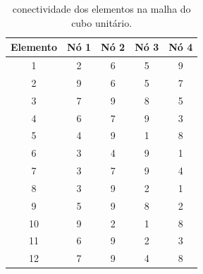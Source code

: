 \begin{table}
    \centering
    \caption{conectividade dos elementos na malha do cubo unitário.}
    \begin{tabular}{c | c c c c}
        \toprule
        \textbf{Elemento} & \textbf{Nó 1} & \textbf{Nó 2} & \textbf{Nó 3}  & \textbf{Nó 4} \\
        \midrule
        1 & 2 & 6 & 5 & 9 \\
        2 & 9 & 6 & 5 & 7 \\
        3 & 7 & 9 & 8 & 5 \\
        4 & 6 & 7 & 9 & 3 \\
        5 & 4 & 9 & 1 & 8 \\
        6 & 3 & 4 & 9 & 1 \\
        7 & 3 & 7 & 9 & 4 \\
        8 & 3 & 9 & 2 & 1 \\
        9 & 5 & 9 & 8 & 2 \\
        10 & 9 & 2 & 1 & 8 \\
        11 & 6 & 9 & 2 & 3 \\
        12 & 7 & 9 & 4 & 8 \\
        \bottomrule
    \end{tabular}
    \label{tab:elementos_cubo}
\end{table}

